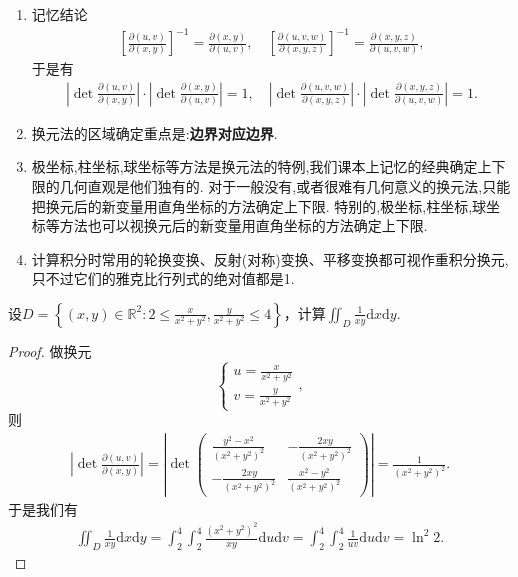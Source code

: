 \documentclass[../../main.tex]{subfiles}%
\begin{document}
\begin{remark}
\begin{enumerate}[(1)]
\item 记忆结论
\begin{align*}
\left[\frac{\partial(u,v)}{\partial(x,y)}\right]^{-1} = \frac{\partial(x,y)}{\partial(u,v)}, \quad \left[\frac{\partial(u,v,w)}{\partial(x,y,z)}\right]^{-1} = \frac{\partial(x,y,z)}{\partial(u,v,w)},
\end{align*}
于是有
\begin{align*}
\left|\det \frac{\partial(u,v)}{\partial(x,y)}\right| \cdot \left|\det \frac{\partial(x,y)}{\partial(u,v)}\right| = 1,\quad  \left|\det \frac{\partial(u,v,w)}{\partial(x,y,z)}\right| \cdot \left|\det \frac{\partial(x,y,z)}{\partial(u,v,w)}\right| = 1.
\end{align*}

\item 换元法的区域确定重点是:\textbf{边界对应边界}.

\item 极坐标,柱坐标,球坐标等方法是换元法的特例,我们课本上记忆的经典确定上下限的几何直观是他们独有的. 对于一般没有,或者很难有几何意义的换元法,只能把换元后的新变量用直角坐标的方法确定上下限. 特别的,极坐标,柱坐标,球坐标等方法也可以视换元后的新变量用直角坐标的方法确定上下限.

\item 计算积分时常用的轮换变换、反射(对称)变换、平移变换都可视作重积分换元,只不过它们的雅克比行列式的绝对值都是1.
\end{enumerate}
\end{remark}

\begin{example}
设$D=\left\{(x,y)\in\mathbb{R}^2:2\leqslant \frac{x}{x^2+y^2},\frac{y}{x^2+y^2}\leqslant4\right\}$，计算$\iint_{D}\frac{1}{xy}\mathrm{d}x\mathrm{d}y$.
\end{example}

\begin{proof}
做换元
\[
\begin{cases}
u=\displaystyle\frac{x}{x^2+y^2}\\[4pt]
v=\displaystyle\frac{y}{x^2+y^2}
\end{cases},
\]
则
\begin{align*}
\left|\det \frac{\partial(u,v)}{\partial(x,y)}\right|
=\left|\det \begin{pmatrix}
\displaystyle\frac{y^2-x^2}{(x^2+y^2)^2} & \displaystyle-\frac{2xy}{(x^2+y^2)^2}\\[6pt]
\displaystyle-\frac{2xy}{(x^2+y^2)^2} & \displaystyle\frac{x^2-y^2}{(x^2+y^2)^2}
\end{pmatrix}\right|
=\frac{1}{(x^2+y^2)^2}.
\end{align*}
于是我们有
\begin{align*}
\iint_{D}\frac{1}{xy}\mathrm{d}x\mathrm{d}y
=\int_{2}^{4}\int_{2}^{4}\frac{(x^2+y^2)^2}{xy}\mathrm{d}u\mathrm{d}v
=\int_{2}^{4}\int_{2}^{4}\frac{1}{uv}\mathrm{d}u\mathrm{d}v=\ln^2 2.
\end{align*}\end{proof}
\end{document}
